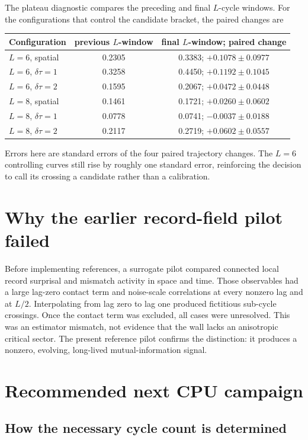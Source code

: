 \documentclass[10pt]{article}
\begin{document}
The plateau diagnostic compares the preceding and final $L$-cycle windows.
For the configurations that control the candidate bracket, the paired changes
are
\begin{center}
\begin{tabular}{lcc}
\toprule
Configuration & previous $L$-window & final $L$-window; paired change\\
\midrule
$L=6$, spatial & 0.2305 & 0.3383; $+0.1078\pm0.0977$\\
$L=6$, $\delta\tau=1$ & 0.3258 & 0.4450; $+0.1192\pm0.1045$\\
$L=6$, $\delta\tau=2$ & 0.1595 & 0.2067; $+0.0472\pm0.0448$\\
$L=8$, spatial & 0.1461 & 0.1721; $+0.0260\pm0.0602$\\
$L=8$, $\delta\tau=1$ & 0.0778 & 0.0741; $-0.0037\pm0.0188$\\
$L=8$, $\delta\tau=2$ & 0.2117 & 0.2719; $+0.0602\pm0.0557$\\
\bottomrule
\end{tabular}
\end{center}
Errors here are standard errors of the four paired trajectory changes.  The
$L=6$ controlling curves still rise by roughly one standard error, reinforcing
the decision to call its crossing a candidate rather than a calibration.

\section{Why the earlier record-field pilot failed}

Before implementing references, a surrogate pilot compared connected local
record surprisal and mismatch activity in space and time.  Those observables
had a large lag-zero contact term and noise-scale correlations at every nonzero
lag and at $L/2$.  Interpolating from lag zero to lag one produced fictitious
sub-cycle crossings.  Once the contact term was excluded, all cases were
unresolved.  This was an estimator mismatch, not evidence that the wall lacks
an anisotropic critical sector.  The present reference pilot confirms the
distinction: it produces a nonzero, evolving, long-lived mutual-information
signal.

\section{Recommended next CPU campaign}

\subsection{How the necessary cycle count is determined}
\end{document}
